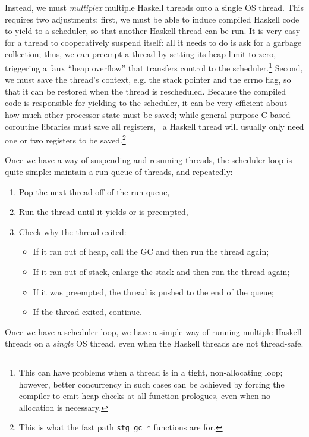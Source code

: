 Instead, we must \emph{multiplex} multiple Haskell threads onto a single
OS thread.  This requires two adjustments: first, we must be able to
induce compiled Haskell code to yield to a scheduler, so that another
Haskell thread can be run.  It is very easy for a thread to
cooperatively suspend itself: all it needs to do is ask for a garbage
collection; thus, we can preempt a thread by setting its heap limit to
zero, triggering a faux ``heap overflow'' that transfers control to the
scheduler.\footnote{This can have problems when a thread is in a tight,
    non-allocating loop; however, better concurrency in such cases can
be achieved by forcing the compiler to emit heap checks at all function
prologues, even when no allocation is necessary.}
Second, we must save the thread's context, e.g. the stack pointer and
the errno flag, so that it can be restored when the thread is
rescheduled.  Because the compiled code is responsible for yielding to
the scheduler, it can be very efficient about how much other processor
state must be saved; while general purpose C-based coroutine libraries
must save all registers,~\XXX{} a Haskell thread will usually only need
one or two registers to be saved.\footnote{This is what the fast path \texttt{stg\_gc\_*} functions are for.}

Once we have a way of suspending and resuming threads, the scheduler
loop is quite simple: maintain a run queue of threads, and repeatedly:

\begin{enumerate}
    \item Pop the next thread off of the run queue,
    \item Run the thread until it yields or is preempted,
    \item Check why the thread exited:
        \begin{itemize}
            \item If it ran out of heap, call the GC and then run the thread again;
            \item If it ran out of stack, enlarge the stack and then run the thread again;
            \item If it was preempted, the thread is pushed to the end of the queue;
            \item If the thread exited, continue.
        \end{itemize}
\end{enumerate}

Once we have a scheduler loop, we have a simple way of running multiple
Haskell threads on a \emph{single} OS thread, even when the Haskell
threads are not thread-safe.

